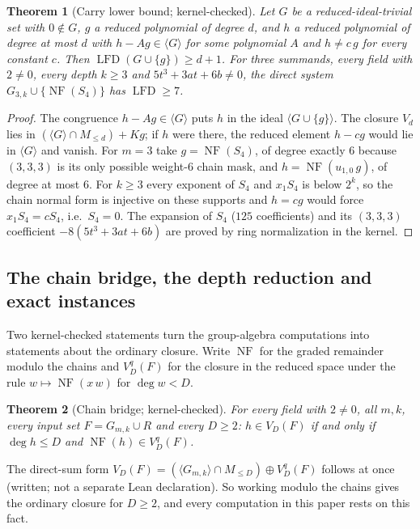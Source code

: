 \documentclass[11pt]{article}
\newtheorem{theorem}{Theorem}
\theoremstyle{definition}\newtheorem{definition}[theorem]{Definition}
\theoremstyle{remark}\newtheorem{remark}[theorem]{Remark}
\newcommand{\lfd}{\operatorname{LFD}}
\newcommand{\NF}{\operatorname{NF}}
\begin{document}
\begin{theorem}[Carry lower bound; kernel-checked]\label{thm:carry}
Let $G$ be a reduced-ideal-trivial set with $0\notin G$, $g$ a reduced polynomial of degree
$d$, and $h$ a reduced polynomial of degree at most $d$ with
$h-A g\in\langle G\rangle$ for some polynomial $A$ and $h\ne c\,g$ for every constant
$c$. Then $\lfd(G\cup\{g\})\ge d+1$. For three summands, every field with
$2\ne0$, every depth $k\ge3$ and $5t^3+3at+6b\ne0$, the direct system
$G_{3,k}\cup\{\NF(S_4)\}$ has $\lfd\ge7$.
\end{theorem}
\begin{proof}
The congruence $h-A g\in\langle G\rangle$ puts $h$ in the ideal
$\langle G\cup\{g\}\rangle$. The closure $V_d$ lies in
$(\langle G\rangle\cap M_{\le d})+K g$; if $h$ were there, the reduced element $h-cg$ would lie in $\langle G\rangle$ and
vanish. For $m=3$ take $g=\NF(S_4)$, of degree exactly $6$ because
$(3,3,3)$ is its only possible weight-$6$ chain mask, and
$h=\NF(u_{1,0}\,g)$, of degree at most $6$. For $k\ge3$ every exponent of
$S_4$ and $x_1S_4$ is below $2^k$, so the chain normal form is injective on
these supports and $h=cg$ would force $x_1S_4=cS_4$, i.e.\ $S_4=0$. The
expansion of $S_4$ ($125$ coefficients) and its $(3,3,3)$ coefficient
$-8(5t^3+3at+6b)$ are proved by ring normalization in the kernel.
\end{proof}

\subsection{The chain bridge, the depth reduction and exact instances}\label{sec:depthred}
Two kernel-checked statements turn the group-algebra computations into
statements about the ordinary closure. Write $\NF$ for the graded
remainder modulo the chains and $V^{q}_D(F)$ for the closure in the reduced
space under the rule $w\mapsto\NF(x\,w)$ for $\deg w<D$.

\begin{theorem}[Chain bridge; kernel-checked]\label{thm:bridge}
For every field with $2\ne0$, all $m,k$, every input set
$F=G_{m,k}\cup R$ and every $D\ge2$: $h\in V_D(F)$ if and only if
$\deg h\le D$ and $\NF(h)\in V^{q}_D(F)$.
\end{theorem}
The direct-sum form $V_D(F)=(\langle G_{m,k}\rangle\cap M_{\le D})\oplus
V^{q}_D(F)$ follows at once (written; not a separate Lean declaration).
So working modulo the chains gives the ordinary closure for $D\ge2$, and
every computation in this paper rests on this fact.
\end{document}
